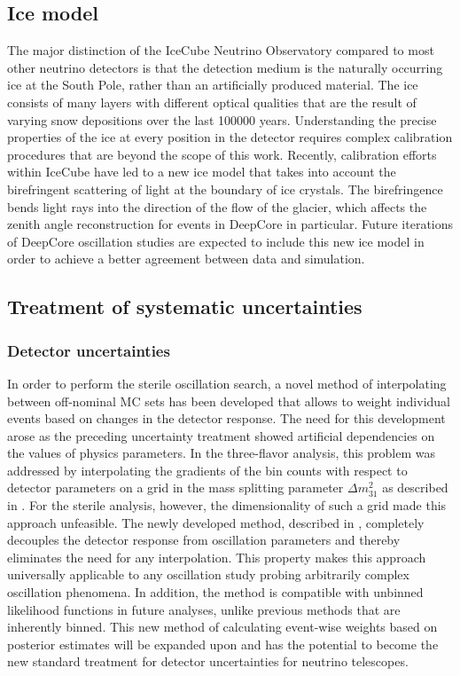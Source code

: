 \subsection{Ice model}
The major distinction of the IceCube Neutrino Observatory compared to most other neutrino detectors is that the detection medium is the naturally occurring ice at the South Pole, rather than an artificially produced material.
The ice consists of many layers with different optical qualities that are the result of varying snow depositions over the last \num{100000} years.
Understanding the precise properties of the ice at every position in the detector requires complex calibration procedures that are beyond the scope of this work.
Recently, calibration efforts within IceCube have led to a new ice model that takes into account the birefringent scattering of light at the boundary of ice crystals.
The birefringence bends light rays into the direction of the flow of the glacier, which affects the zenith angle reconstruction for events in DeepCore in particular.
Future iterations of DeepCore oscillation studies are expected to include this new ice model in order to achieve a better agreement between data and simulation.

\subsection{Treatment of systematic uncertainties}
\subsubsection{Detector uncertainties}
In order to perform the sterile oscillation search, a novel method of interpolating between off-nominal MC sets has been developed that allows to weight individual events based on changes in the detector response.
The need for this development arose as the preceding uncertainty treatment showed artificial dependencies on the values of physics parameters.
In the three-flavor analysis, this problem was addressed by interpolating the gradients of the bin counts with respect to detector parameters on a grid in the mass splitting parameter $\Delta m^2_{31}$ as described in .
For the sterile analysis, however, the dimensionality of such a grid made this approach unfeasible.
The newly developed method, described in , completely decouples the detector response from oscillation parameters and thereby eliminates the need for any interpolation.
This property makes this approach universally applicable to any oscillation study probing arbitrarily complex oscillation phenomena.
In addition, the method is compatible with unbinned likelihood functions in future analyses, unlike previous methods that are inherently binned.
This new method of calculating event-wise weights based on posterior estimates will be expanded upon and has the potential to become the new standard treatment for detector uncertainties for neutrino telescopes.


